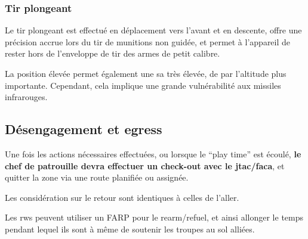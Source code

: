 \subsubsection{Tir plongeant}

\e
    \item
    Le tir plongeant est effectué en déplacement vers l’avant et en descente, offre une précision accrue lors du tir de munitions non guidée, et permet à l’appareil de rester hors de l’enveloppe de tir des armes de petit calibre.

    \item
    La position élevée permet également une \gls{sa} très élevée, de par l’altitude plus importante. Cependant, cela implique une grande vulnérabilité aux missiles infrarouges.
\ed

\subsection{Désengagement et egress}

\e
    \item
    Une fois les actions nécessaires effectuées, ou lorsque le “play time” est écoulé, \textbf{le chef de patrouille devra effectuer un check-out avec le \gls{jtac}/\gls{faca}}, et quitter la zone via une route planifiée ou assignée.
    \item Les considération sur le retour sont identiques à celles de l’aller.
    \item Les \gls{rw}s peuvent utiliser un FARP pour le rearm/refuel, et ainsi allonger le temps pendant lequel ils sont à même de soutenir les troupes au sol alliées.
    \item {}

\ed





